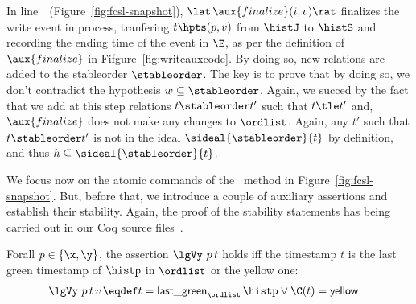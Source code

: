 


In line~\lineWrtFnz~(Figure~\ref{fig:fcsl-snapshot}),
$ \lat\,\aux{finalize}(i,v)\rat $ finalizes the write event in
process, tranfering $t \hpts (p,v)$ from $\histJ$ to $\histS$ and
recording the ending time of the event in $\E$, as per the definition
of $\aux{finalize}$ in Fifgure~\ref{fig:writeauxcode}. By doing so,
new relations are added to the stableorder $\stableorder$. The key is
to prove that by doing so, we don't contradict the hypothesis $
w \subseteq \stableorder $. Again, we succed by the fact that we add
at this step relations $t \stableorder t'$ such that $t \tle t'$ and,
$\aux{finalize}$ does not make any changes to $\ordlist$. Again, any
$t'$ such that $ t \stableorder t'$ is not in the ideal
$\sideal{\stableorder}{t}$ by definition, and thus $
h \subseteq \sideal{\stableorder}{t} $.

We focus now on the atomic commands of the \jyscan~method in
Figure~\ref{fig:fcsl-snapshot}. But, before that, we introduce a
couple of auxiliary assertions and establish their stability. Again,
the proof of the stability statements has being carried out in our Coq
source files~\cite{CoqFiles}.

\begin{definition}\label{def:lgVy}%
Forall $p \in \{\x, \y\}$, the assertion $ \lgVy\ p\, t$ holds iff the
timestamp $t$ is the last green timestamp of $\histp$ in $\ordlist$ or
the yellow one:
%
\begin{align*}
\lgVy\ p\, t\, v\, \eqdef & t = \mathsf{last\_green}_{\ordlist}\,
\histp \vee \C(t) = \mathsf{yellow}
\end{align*}
\end{definition}

